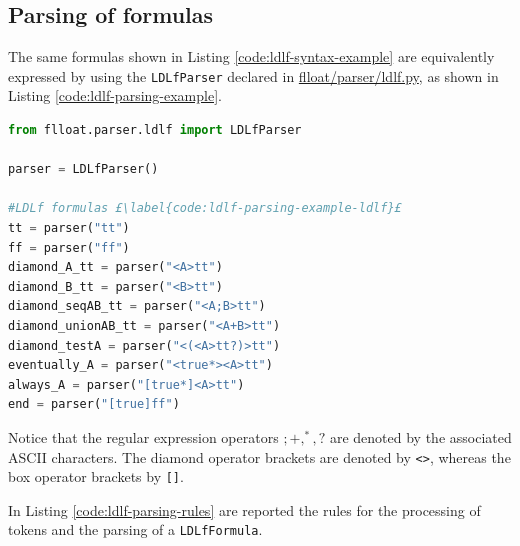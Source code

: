 \subsection{Parsing of \LDLf formulas}
The same \LDLf formulas shown in Listing \ref{code:ldlf-syntax-example} are equivalently expressed by using the \texttt{LDLfParser} declared in \href{https://github.com/MarcoFavorito/flloat/blob/0.1.4/flloat/parser/ldlf.py}{flloat/parser/ldlf.py}, as shown in Listing \ref{code:ldlf-parsing-example}.
\begin{lstlisting}[language=Python, style=Python, escapechar = £, label={code:ldlf-parsing-example}, caption={Examples of \LDLf parsing}]
from flloat.parser.ldlf import LDLfParser

parser = LDLfParser()

#LDLf formulas £\label{code:ldlf-parsing-example-ldlf}£
tt = parser("tt")
ff = parser("ff")
diamond_A_tt = parser("<A>tt")
diamond_B_tt = parser("<B>tt")
diamond_seqAB_tt = parser("<A;B>tt")
diamond_unionAB_tt = parser("<A+B>tt")
diamond_testA = parser("<(<A>tt?)>tt")
eventually_A = parser("<true*><A>tt")
always_A = parser("[true*]<A>tt")
end = parser("[true]ff")
\end{lstlisting}
Notice that the regular expression operators $; +, ^*, ?$ are denoted by the associated ASCII characters. The diamond operator brackets are denoted by \texttt{<>}, whereas the box operator brackets by \texttt{[]}.

In Listing \ref{code:ldlf-parsing-rules} are reported the rules for the processing of \LDLf tokens and the parsing of a \texttt{LDLfFormula}.

